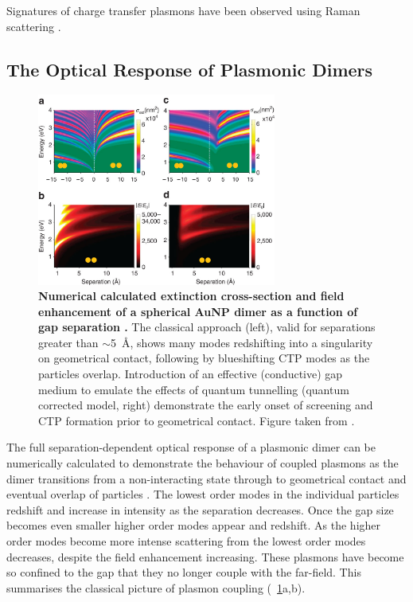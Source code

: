 \documentclass{article}
\begin{document}
Signatures of charge transfer plasmons have been observed using Raman scattering \cite{elkhoury2014}.


\subsection{The Optical Response of Plasmonic Dimers}

\begin{figure}[bt]
\centering
\includegraphics[width=0.7\textwidth]{figures/literature/ncomms1806-f4}
\caption[Numerical calculated extinction cross-section and field enhancement of a spherical AuNP dimer as a function of gap separation \cite{esteban2012}]{\textbf{Numerical calculated extinction cross-section and field enhancement of a spherical AuNP dimer as a function of gap separation \cite{esteban2012}.} The classical approach (left), valid for separations greater than $\sim$\SI{5}{\angstrom}, shows many modes redshifting into a singularity on geometrical contact, following by blueshifting CTP modes as the particles overlap. Introduction of an effective (conductive) gap medium to emulate the effects of quantum tunnelling (quantum corrected model, right) demonstrate the early onset of screening and CTP formation prior to geometrical contact. Figure taken from \cite{esteban2012}.}
\label{fig:optical_response_dimer}
\end{figure}

The full separation-dependent optical response of a plasmonic dimer can be numerically calculated to demonstrate the behaviour of coupled plasmons as the dimer transitions from a non-interacting state through to geometrical contact and eventual overlap of particles \cite{romero2006, esteban2012}.
The lowest order modes in the individual particles redshift and increase in intensity as the separation decreases. Once the gap size becomes even smaller higher order modes appear and redshift. As the higher order modes become more intense scattering from the lowest order modes decreases, despite the field enhancement increasing. These plasmons have become so confined to the gap that they no longer couple with the far-field. This summarises the classical picture of plasmon coupling (\figurename~\ref{fig:optical_response_dimer}a,b).
\end{document}
